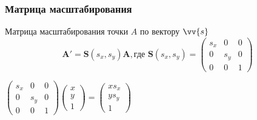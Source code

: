 \documentclass[10pt]{beamer}
\begin{document}
\begin{frame}\frametitle{Матрица масштабирования}
	\begin{block}{Матрица масштабирования точки $A$ по вектору $\vv{s}$ }
		$$
			\textbf{A}' =\textbf{S}(s_x,s_y) \textbf{A}, \text{где } \textbf{S}(s_x,s_y) =
			\begin{pmatrix}
				s_x&0&0\\
				0&s_y&0\\
				0&0&1
			\end{pmatrix} 
		$$
	\end{block}
	$
		\begin{pmatrix}
			s_x&0&0\\
			0&s_y&0\\
			0&0&1
		\end{pmatrix}
		\begin{pmatrix}
			x\\
			y\\
			1
		\end{pmatrix}
		=
		\begin{pmatrix}
			xs_x\\
			ys_y\\
			1
		\end{pmatrix}
	$
\end{frame}
\end{document}
